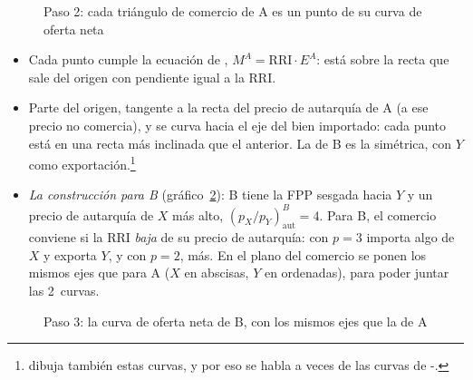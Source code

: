 \documentclass[11pt]{article}
\begin{document}
\begin{figure}[H]
\centering
\caption{Paso 2: cada triángulo de comercio de A es un punto de su curva de oferta neta}\label{fig:haberler-oferta-neta-a}
\end{figure}
\begin{itemize}

  \item Cada punto cumple la ecuación de , $M^A=\mathrm{RRI}\cdot E^A$: está sobre la recta que sale del origen con pendiente igual a la RRI.
  \item Parte del origen, tangente a la recta del precio de autarquía de A (a ese precio no comercia), y se curva hacia el eje del bien importado: cada punto está en una recta más inclinada que el anterior. La de B es la simétrica, con $Y$ como exportación.\footnote{\textcite{Edgeworth1894Theory} dibuja también estas curvas, y por eso se habla a veces de las curvas de -.}
\item \emph{La construcción para B} (gráfico~\ref{fig:haberler-oferta-neta-b}): B tiene la FPP sesgada hacia $Y$ y un precio de autarquía de $X$ más alto, $(p_X/p_Y)^B_{\mathrm{aut}}=4$. Para B, el comercio conviene si la RRI \emph{baja} de su precio de autarquía: con $p=3$ importa algo de $X$ y exporta $Y$, y con $p=2$, más. En el plano del comercio se ponen los mismos ejes que para A ($X$ en abscisas, $Y$ en ordenadas), para poder juntar las 2~curvas.
\end{itemize}
\begin{figure}[H]
\centering
\caption{Paso 3: la curva de oferta neta de B, con los mismos ejes que la de A}\label{fig:haberler-oferta-neta-b}
\end{figure}
\end{document}
